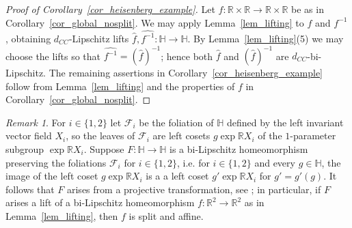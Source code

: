 \documentclass[titlepage]{amsart}
\numberwithin{equation}{section}
\theoremstyle{plain}
\theoremstyle{definition}
\theoremstyle{remark}
\newtheorem{remark}[equation]{Remark}
\newcommand{\f}{\mathcal{F}}
\renewcommand{\H}{\mathbb{H}}
\newcommand{\R}{\mathbb{R}}
\newcommand{\ra}{\rightarrow}
\begin{document}
\begin{proof}[Proof of Corollary~\ref{cor_heisenberg_example}]
Let $f:\R\times\R\ra\R\times\R$ be as in Corollary~\ref{cor_global_nosplit}.  We may apply Lemma~\ref{lem_lifting} to $f$ and $f^{-1}$, obtaining $d_{CC}$-Lipschitz lifts $\hat f,\widehat {f^{-1}}:\H\ra\H$.  By Lemma~\ref{lem_lifting}(5) we may choose the lifts so that $\widehat {f^{-1}}=(\hat f)^{-1}$; hence both $\hat f$ and $(\hat f)^{-1}$ are $d_{CC}$-bi-Lipschitz.  The remaining assertions in Corollary~\ref{cor_heisenberg_example} follow from Lemma~\ref{lem_lifting} and the properties of $f$ in Corollary~\ref{cor_global_nosplit}.  
\end{proof}

\bigskip
\begin{remark}
\label{rem_f1_f2_rigidity}
For $i\in \{1,2\}$ let $\f_i$ be the foliation of $\H$ defined by the left invariant vector field $X_i$, so the leaves of $\f_i$ are left cosets $g\exp\R X_i$ of the $1$-parameter subgroup $\exp\R X_i$.
Suppose $F:\H\ra \H$ is a bi-Lipschitz homeomorphism preserving the foliations $\f_i$ for $i\in \{1,2\}$, i.e. for $i\in \{1,2\}$ and every $g\in \H$, the image of the left coset $g\exp\R X_i$ is a a left coset $g'\exp\R X_i$ for $g'=g'(g)$.  It follows that $F$ arises from a projective transformation, see \cite{kmx_iwasawa}; in particular, if $F$ arises a lift of a bi-Lipschitz homeomorphism $f:\R^2\ra\R^2$ as in Lemma~\ref{lem_lifting}, then $f$ is split and affine.

\end{remark}







 
\end{document}
